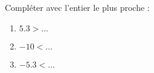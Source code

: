 
    \begin{mental}
        Compléter avec l'entier le plus proche :
        \begin{enumerate}
            \item
                \( 5.3>\ldots\)
            \item
                \( -10<\ldots\)
            \item
                \( -5.3<\ldots\)
        \end{enumerate}
    \end{mental}
